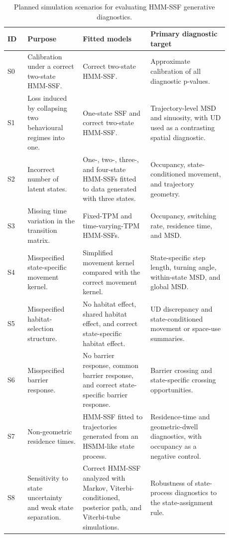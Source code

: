 \documentclass[11pt]{article}
\begin{document}
\begin{table}[ht]
\centering
\caption{Planned simulation scenarios for evaluating HMM-SSF generative diagnostics.}
\label{tab:simulation-plan}
\renewcommand{\arraystretch}{1.15}
\setlength{\tabcolsep}{3pt}
\footnotesize
\begin{tabular}{p{0.08\linewidth}p{0.22\linewidth}p{0.27\linewidth}p{0.31\linewidth}}
\toprule
ID & Purpose & Fitted models & Primary diagnostic target \\
\midrule
S0 & Calibration under a correct two-state HMM-SSF. &
Correct two-state HMM-SSF. &
Approximate calibration of all diagnostic p-values. \\

S1 & Loss induced by collapsing two behavioural regimes into one. &
One-state SSF and correct two-state HMM-SSF. &
Trajectory-level MSD and sinuosity, with UD used as a contrasting spatial diagnostic. \\

S2 & Incorrect number of latent states. &
One-, two-, three-, and four-state HMM-SSFs fitted to data generated with three states. &
Occupancy, state-conditioned movement, and trajectory geometry. \\

S3 & Missing time variation in the transition matrix. &
Fixed-TPM and time-varying-TPM HMM-SSFs. &
Occupancy, switching rate, residence time, and MSD. \\

S4 & Misspecified state-specific movement kernel. &
Simplified movement kernel compared with the correct movement kernel. &
State-specific step length, turning angle, within-state MSD, and global MSD. \\

S5 & Misspecified habitat-selection structure. &
No habitat effect, shared habitat effect, and correct state-specific habitat effect. &
UD discrepancy and state-conditioned movement or space-use summaries. \\

S6 & Misspecified barrier response. &
No barrier response, common barrier response, and correct state-specific barrier response. &
Barrier crossing and state-specific crossing opportunities. \\

S7 & Non-geometric residence times. &
HMM-SSF fitted to trajectories generated from an HSMM-like state process. &
Residence-time and geometric-dwell diagnostics, with occupancy as a negative control. \\

S8 & Sensitivity to state uncertainty and weak state separation. &
Correct HMM-SSF analyzed with Markov, Viterbi-conditioned, posterior path, and Viterbi-tube simulations. &
Robustness of state-process diagnostics to the state-assignment rule. \\
\bottomrule
\end{tabular}
\end{table}
\end{document}

